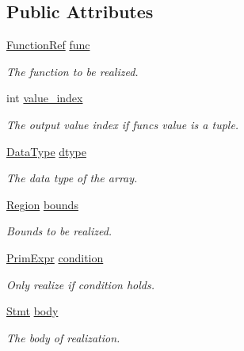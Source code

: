 \subsection*{Public Attributes}
\begin{DoxyCompactItemize}
\item 
\hyperlink{classtvm_1_1tir_1_1FunctionRef}{Function\+Ref} \hyperlink{classtvm_1_1tir_1_1RealizeNode_ac74657f89ed01d27c42a123aa9c4e1d0}{func}
\begin{DoxyCompactList}\small\item\em The function to be realized. \end{DoxyCompactList}\item 
int \hyperlink{classtvm_1_1tir_1_1RealizeNode_ab126f401e72fe4b9b1ceee3a9dffaaef}{value\+\_\+index}
\begin{DoxyCompactList}\small\item\em The output value index if func\textquotesingle{}s value is a tuple. \end{DoxyCompactList}\item 
\hyperlink{namespacetvm_a41918af1a1dc386388639a9d3ad06c5d}{Data\+Type} \hyperlink{classtvm_1_1tir_1_1RealizeNode_a94cf509b9b13b5975fde6e04abf15314}{dtype}
\begin{DoxyCompactList}\small\item\em The data type of the array. \end{DoxyCompactList}\item 
\hyperlink{namespacetvm_1_1tir_a8277e2a3d81a80a4776705673df51e0a}{Region} \hyperlink{classtvm_1_1tir_1_1RealizeNode_a5e2e8544a255e076311ff44eee46b9c7}{bounds}
\begin{DoxyCompactList}\small\item\em Bounds to be realized. \end{DoxyCompactList}\item 
\hyperlink{classtvm_1_1PrimExpr}{Prim\+Expr} \hyperlink{classtvm_1_1tir_1_1RealizeNode_a19b83a431ad0ac0d5c361b359f0bb0fa}{condition}
\begin{DoxyCompactList}\small\item\em Only realize if condition holds. \end{DoxyCompactList}\item 
\hyperlink{classtvm_1_1tir_1_1Stmt}{Stmt} \hyperlink{classtvm_1_1tir_1_1RealizeNode_aa8a89873f73042f8784913b7f088297e}{body}
\begin{DoxyCompactList}\small\item\em The body of realization. \end{DoxyCompactList}\end{DoxyCompactItemize}
